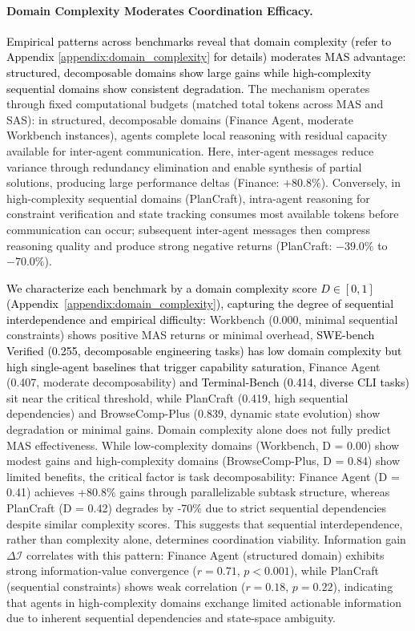 \paragraph{Domain Complexity Moderates Coordination Efficacy.} \textcolor{black}{Empirical patterns across benchmarks reveal that domain complexity (refer to Appendix \ref{appendix:domain_complexity} for details) moderates MAS advantage: structured, decomposable domains show large gains while high-complexity sequential domains show consistent degradation.} The mechanism operates through fixed computational budgets (matched total tokens across MAS and SAS): in structured, decomposable domains (Finance Agent, moderate Workbench instances), agents complete local reasoning with residual capacity available for inter-agent communication. Here, inter-agent messages reduce variance through redundancy elimination and enable synthesis of partial solutions, producing large performance deltas (Finance: $+80.8\%$). Conversely, in high-complexity sequential domains (PlanCraft), intra-agent reasoning for constraint verification and state tracking consumes most available tokens before communication can occur; subsequent inter-agent messages then compress reasoning quality and produce strong negative returns (PlanCraft: $-39.0\%$ to $-70.0\%$).
  
\textcolor{black}{We characterize each benchmark by a domain complexity score $D \in [0,1]$ (Appendix~\ref{appendix:domain_complexity}), capturing the degree of sequential interdependence and empirical difficulty:} Workbench (0.000, minimal sequential constraints) shows positive MAS returns or minimal overhead, \textcolor{black}{SWE-bench Verified (0.255, decomposable engineering tasks) has low domain complexity but high single-agent baselines that trigger capability saturation,} Finance Agent (0.407, moderate decomposability) \textcolor{black}{and Terminal-Bench (0.414, diverse CLI tasks)} sit near the critical threshold, while PlanCraft (0.419, high sequential dependencies) and BrowseComp-Plus (0.839, dynamic state evolution) show degradation or minimal gains. Domain complexity alone does not fully predict MAS effectiveness. While low-complexity domains (Workbench, D = 0.00) show modest gains and high-complexity domains (BrowseComp-Plus, D = 0.84) show limited benefits, the critical factor is task decomposability: Finance Agent (D = 0.41) achieves +80.8\% gains through parallelizable subtask structure, whereas PlanCraft (D = 0.42) degrades by -70\% due to strict sequential dependencies despite similar complexity scores. This suggests that sequential interdependence, rather than complexity alone, determines coordination viability. Information gain $\Delta\mathcal{I}$ correlates with this pattern: Finance Agent (structured domain) exhibits strong information-value convergence ($r = 0.71$, $p < 0.001$), while PlanCraft (sequential constraints) shows weak correlation ($r = 0.18$, $p = 0.22$), indicating that agents in high-complexity domains exchange limited actionable information due to inherent sequential dependencies and state-space ambiguity.
  
